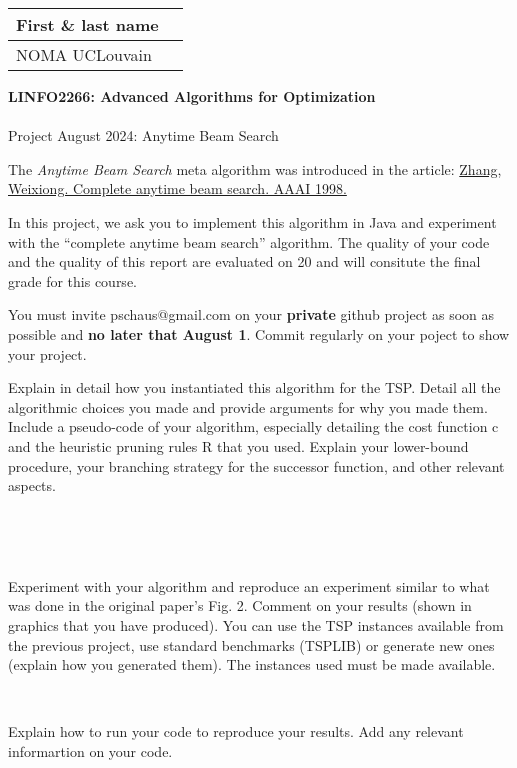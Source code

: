 \documentclass[12pt]{report}
\newcommand{\answerbox}[2]{\hfill\break\\
        \framebox[\linewidth]{\parbox[c][#1][c]{\dimexpr\linewidth-2\fboxsep-2\fboxrule}{#2}}
}
\begin{document}
\hfill
\begingroup
\Large
\begin{tabular}{|l|p{6cm}|}
	\hline
	First \& last name &
	\\ \hline
	NOMA UCLouvain & 
	\\ \hline
\end{tabular}
\endgroup
\vspace{1.5cm}

\noindent
\begingroup
	\Large
	\textbf{LINFO2266: Advanced Algorithms for Optimization}\\\\
	Project August 2024: Anytime Beam Search
\endgroup
\vspace{0.2cm}

\begin{Exercise}[title={Anytime Beam Search for the TSP}]


The \textit{Anytime Beam Search} meta algorithm was introduced in the article:
\href{https://cdn.aaai.org/AAAI/1998/AAAI98-060.pdf} {Zhang, Weixiong. Complete anytime beam search. AAAI 1998.}


In this project, we ask you to implement this algorithm in Java and experiment with the “complete anytime beam search” algorithm.
The quality of your code and the quality of this report are evaluated on 20 and will consitute the final grade for this course.

You must invite pschaus@gmail.com on your \textbf{private} github project as soon as possible and \textbf{no later that August 1}. 
Commit regularly on your poject to show your project.


\Question Explain in detail how you instantiated this algorithm for the TSP. Detail all the algorithmic choices you made and provide arguments for why you made them. Include a pseudo-code of your algorithm, especially detailing the cost function c and the heuristic pruning rules R that you used. Explain your lower-bound procedure, your branching strategy for the successor function, and other relevant aspects.

\answerbox{10cm}{
}

\pagebreak



\answerbox{20cm}{
}


\pagebreak

\Question Experiment with your algorithm and reproduce an experiment similar to what was done in the original paper’s Fig. 2. Comment on your results (shown in graphics that you have produced). You can use the TSP instances available from the previous project, use standard benchmarks (TSPLIB) or generate new ones (explain how you generated them). The instances used must be made available.


\answerbox{20cm}{
}

\pagebreak

\Question Explain how to run your code to reproduce your results. Add any relevant informartion on your code.
\answerbox{20cm}{
}

\

\end{Exercise}
\end{document}
